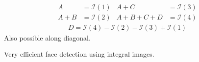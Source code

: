 \begin{compactdesc}
\begin{gather*}
	 \end{gather*}
	 \begin{align*}
		 A&=\mathcal{I}(1)&A+C&=\mathcal{I}(3)\\
		 A+B&=\mathcal{I}(2)&A+B+C+D&=\mathcal{I}(4)
	 \end{align*}
	 \begin{gather*}
		 D=\mathcal{I}(4)-\mathcal{I}(2)-\mathcal{I}(3)+\mathcal{I}(1)
	 \end{gather*}
	 Also possible along diagonal.
 \item[\lp{Viola-Jones cascade face detection}] Very efficient face detection using integral images.
\end{compactdesc}

